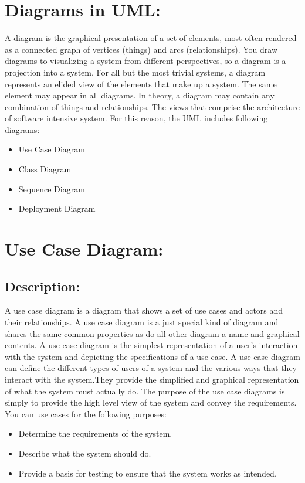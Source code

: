 \section{Diagrams in UML: }
A diagram is the graphical presentation of a set of elements, most often rendered as a connected graph of vertices (things) and arcs (relationships). You draw diagrams to visualizing a system from different perspectives, so a diagram is a projection into a system. For all but the most trivial systems, a diagram represents an elided view of the elements that make up a system. The same element may appear in all diagrams. In theory, a diagram may contain any combination of things and relationships. The views that comprise the architecture of software intensive system. For this reason, the UML includes following diagrams:
\begin{itemize}
\item Use Case Diagram 
\item Class Diagram 
\item Sequence Diagram
\item Deployment Diagram
\end {itemize}

\section{Use Case Diagram: }
\subsection{Description:}
A use case diagram is a diagram that shows a set of use cases and actors and their relationships. A use case diagram is a just special kind of diagram and shares the same common properties as do all other diagram-a name and graphical contents.
A use case diagram is the simplest representation of a user's interaction with the system and depicting the specifications of a use case. A use case diagram can define the different types of users of a system and the various ways that they interact with the system.They provide the simplified and graphical representation of what the system must actually do.\cite{sups}
The purpose of the use case diagrams is simply to provide the high level view of the system and convey the requirements.
You can use cases for the following purposes:
\begin{itemize}
\item Determine the requirements of the system.
\item Describe what the system should do.
\item Provide a basis for testing to ensure that the system works as intended.
\end{itemize}



